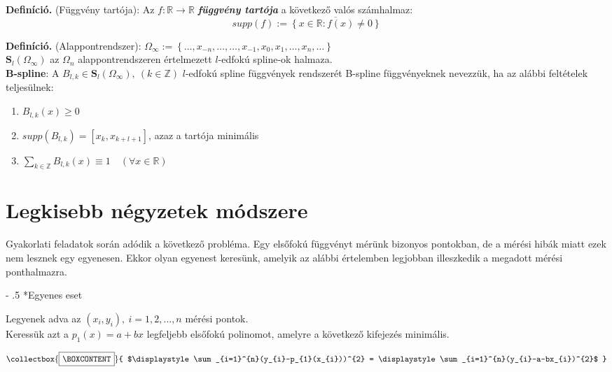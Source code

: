 \documentclass[tikz,12pt,margin=0px]{article}
\makeatletter
\newcommand{\mybox}{%
    \collectbox{%
        \setlength{\fboxsep}{4pt}%
        \fbox{\BOXCONTENT}%
    }%
}
\renewcommand\paragraph{%
	\@startsection{paragraph}{4}{0mm}%
	{-\baselineskip}%
	{.5\baselineskip}%
	{\normalfont\normalsize\bfseries}}
\makeatother
\begin{document}
	\noindent \textbf{Definíció.} (Függvény tartója): Az $f: \mathbb{R} \rightarrow \mathbb{R}$ \emph{\textbf{függvény tartója}} a következő valós számhalmaz:
    \[
        supp(f) := \overline{\left\{x \in \mathbb{R}: f(x) \not = 0 \right\}}
    \]

	\noindent \textbf{Definíció.} (Alappontrendszer): $\Omega_{\infty} := \left\{\ldots, x_{-n}, \ldots, \ldots, x_{-1}, x_{0}, x_{1}, \ldots, x_{n}, \ldots\right\}$\\
	
	\noindent $\mathbf{S}_{l}(\Omega_{\infty})$ az $\Omega_{n}$ alappontrendszeren értelmezett $l$-edfokú spline-ok halmaza.\\

	\noindent \textbf{B-spline}: A $B_{l,k} \in \mathbf{S}_{l}(\Omega_{\infty}),\ (k \in \mathbb{Z})$ $l$-edfokú spline függvények rendszerét B-spline függvényeknek
	nevezzük, ha az alábbi feltételek teljesülnek:
	\begin{enumerate}
		\item	$B_{l,k}(x) \geq 0$
		\item	$supp(B_{l,k}) = [x_{k},x_{k+l+1}]$, azaz a tartója minimális
		\item	$\displaystyle\sum_{k \in \mathbb{Z}}B_{l,k}(x) \equiv 1 \quad (\forall x \in \mathbb{R})$
	\end{enumerate}
	
	\section*{Legkisebb négyzetek módszere}
	
	Gyakorlati feladatok során adódik a következő probléma. Egy elsőfokú függvényt mérünk bizonyos pontokban, de
	a mérési hibák miatt ezek nem lesznek egy egyenesen. Ekkor olyan egyenest keresünk, amelyik az alábbi
	értelemben legjobban illeszkedik a megadott mérési ponthalmazra.
	
    \paragraph*{Egyenes eset}

	\noindent Legyenek adva az $(x_{i},y_{i}),\ i=1,2,\ldots,n$ mérési pontok.\\
    \noindent Keressük azt a $p_{1}(x) = a + bx$ legfeljebb elsőfokú polinomot, amelyre a következő kifejezés minimális.
	
	\begin{displaymath}
        \mybox{
		$\displaystyle\sum_{i=1}^{n}(y_{i}-p_{1}(x_{i}))^{2} =
		\displaystyle\sum_{i=1}^{n}(y_{i}-a-bx_{i})^{2}$
        }
	\end{displaymath}
\end{document}
